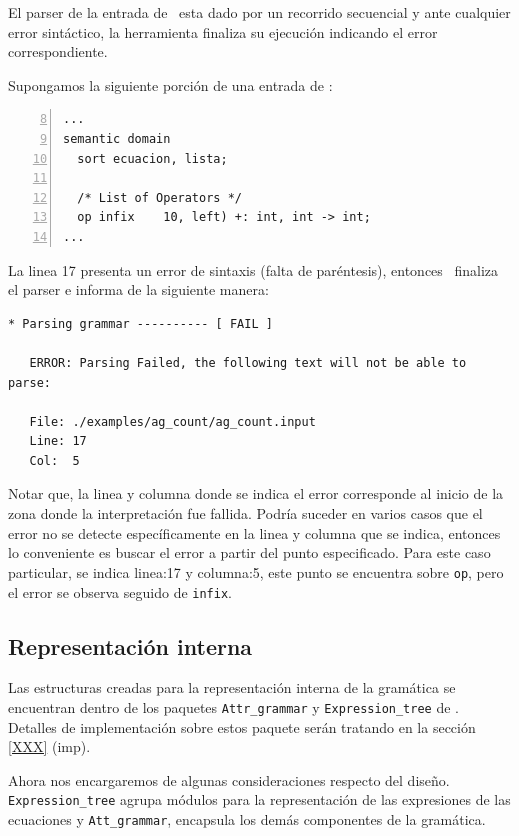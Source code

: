 El parser de la entrada de \maggen\ esta dado por un recorrido secuencial y ante cualquier error sintáctico, la herramienta finaliza su ejecución indicando el error correspondiente. 

Supongamos la siguiente porción de una entrada de \maggen:

\begin{lstlisting}[numbers=left, firstnumber=8, language=specmag, linewidth=8cm, columns=fullflexible]
...
semantic domain
  sort ecuacion, lista;

  /* List of Operators */
  op infix    10, left) +: int, int -> int;
...
\end{lstlisting}
\vspace{0.3cm}

La linea 17 presenta un error de sintaxis (falta de paréntesis), entonces \maggen\ finaliza el parser e informa de la siguiente manera:

\begin{lstlisting}[backgroundcolor=\color{white}, linewidth=15cm]
   * Parsing grammar ---------- [ FAIL ]

   ERROR: Parsing Failed, the following text will not be able to parse:

   File: ./examples/ag_count/ag_count.input
   Line: 17
   Col:  5
\end{lstlisting}
\vspace{0.3cm}

Notar que, la linea y columna donde se indica el error corresponde al inicio de la zona donde la interpretación fue fallida. Podría suceder en varios casos que el error no se detecte específicamente en la linea y columna que se indica, entonces lo conveniente es buscar el error a partir del punto especificado. Para este caso particular, se indica linea:17 y columna:5, este punto se encuentra sobre \texttt{op}, pero el error se observa seguido de \texttt{infix}.

\subsection*{Representación interna}

Las estructuras creadas para la representación interna de la gramática se encuentran dentro de los paquetes \texttt{Attr\_grammar} y \texttt{Expression\_tree} de \maggen. Detalles de implementación sobre estos paquete serán tratando en la sección \ref{XXX} (imp). 

Ahora nos encargaremos de algunas consideraciones respecto del diseño. 
\texttt{Expression\_tree} agrupa módulos para la representación de las expresiones de las ecuaciones y \texttt{Att\_grammar}, encapsula los demás componentes de la gramática.

